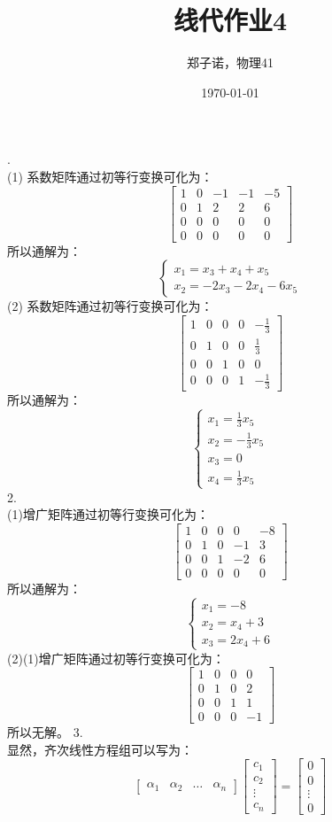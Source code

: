 \documentclass[utf8]{ctexart}
\title{线代作业4}
\author{郑子诺，物理41}
\date{\today}
\begin{document}
\maketitle
{}.\\
(1)
系数矩阵通过初等行变换可化为：
\[\begin{bmatrix}
	1&0&-1&-1&-5\\
	0&1&2&2&6\\
	0&0&0&0&0\\
	0&0&0&0&0
\end{bmatrix}\]
所以通解为：
\[\begin{cases}
	x_1=x_3+x_4+x_5\\
	x_2=-2x_3-2x_4-6x_5
\end{cases}\]
(2)
系数矩阵通过初等行变换可化为：
\[\begin{bmatrix}
	1&0&0&0&-\frac{1}{3}\\
	0&1&0&0&\frac{1}{3}\\
	0&0&1&0&0\\
	0&0&0&1&-\frac{1}{3}
\end{bmatrix}\]
所以通解为：
\[\begin{cases}
	x_1=\frac{1}{3}x_5\\
	x_2=-\frac{1}{3}x_5\\
	x_3=0\\
	x_4=\frac{1}{3}x_5
\end{cases}\]
2.\\
(1)增广矩阵通过初等行变换可化为：
\[\begin{bmatrix}
	1&0&0&0&-8\\
	0&1&0&-1&3\\
	0&0&1&-2&6\\
	0&0&0&0&0
\end{bmatrix}\]
所以通解为：
\[\begin{cases}
	x_1=-8\\
	x_2=x_4+3\\
	x_3=2x_4+6
\end{cases}\]
(2)(1)增广矩阵通过初等行变换可化为：
\[\begin{bmatrix}
	1&0&0&0\\
	0&1&0&2\\
	0&0&1&1\\
	0&0&0&-1
\end{bmatrix}\]
所以无解。
3.\\
显然，齐次线性方程组可以写为：
\[\begin{bmatrix}
	\alpha_1&\alpha_2&\dots&\alpha_n
\end{bmatrix}
\begin{bmatrix}
	c_1\\
	c_2\\
	\vdots\\
	c_n
\end{bmatrix}
=\begin{bmatrix}
	0\\
	0\\
	\vdots\\
	0
\end{bmatrix}\]
\end{document}
